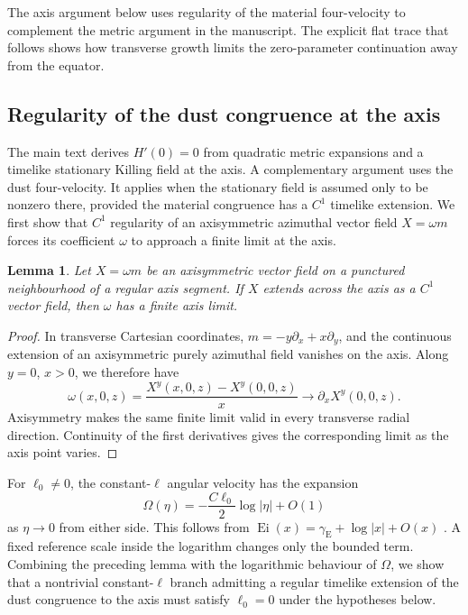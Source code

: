 \documentclass[11pt,a4paper]{article}
\numberwithin{equation}{section}
\theoremstyle{plain}
\newtheorem{lemma}{Lemma}
\theoremstyle{definition}
\theoremstyle{remark}
\newcommand{\ellzero}{\ell_0}
\begin{document}
The axis argument below uses regularity of the material four-velocity to complement the metric argument in the manuscript. The explicit flat trace that follows shows how transverse growth limits the zero-parameter continuation away from the equator.

\subsection{Regularity of the dust congruence at the axis}

The main text derives $H'(0)=0$ from quadratic metric expansions and a
timelike stationary Killing field at the axis. A complementary argument
uses the dust four-velocity. It applies when the stationary field is
assumed only to be nonzero there, provided the material congruence has a
$C^1$ timelike extension. We first show that $C^1$ regularity of an axisymmetric azimuthal vector field $X=\omega m$ forces its coefficient $\omega$ to approach a finite limit at the axis.
\begin{lemma}\label{lem:smooth-azimuthal-coefficient}
Let $X=\omega m$ be an axisymmetric vector field on a punctured
neighbourhood of a regular axis segment. If $X$ extends across the axis
as a $C^1$ vector field, then $\omega$ has a finite axis limit.
\end{lemma}
\begin{proof}
In transverse Cartesian coordinates, $m=-y\partial_x+x\partial_y$, and 
the continuous extension of an axisymmetric purely azimuthal field
vanishes on the axis. Along $y=0$, $x>0$, we therefore have
\begin{equation}
\omega(x,0,z)=\frac{X^y(x,0,z)-X^y(0,0,z)}{x}
\longrightarrow\partial_xX^y(0,0,z).
\end{equation}
Axisymmetry makes the same finite limit valid in every transverse
radial direction. Continuity of the first derivatives gives the
corresponding limit as the axis point varies.
\end{proof}
For $\ellzero\neq 0$, the constant-$\ell$ angular velocity has the
expansion
\begin{equation}\label{eq:constant-l-omega-axis}
\Omega(\eta)=-\frac{C\ellzero}{2}\log|\eta|+O(1)
\end{equation}
as $\eta\to 0$ from either side. This follows from
$\operatorname{Ei}(x)=\gamma_{\mathrm E}+\log|x|+O(x)$
\cite[Eqs.~6.2.6--6.2.7]{NISTDLMF}. A fixed reference scale inside the
logarithm changes only the bounded term. Combining the preceding lemma with the logarithmic behaviour of $\Omega$, we show that a nontrivial constant-$\ell$ branch admitting a regular timelike extension of the dust congruence to the axis must satisfy $\ell_0=0$ under the hypotheses below.
\end{document}

